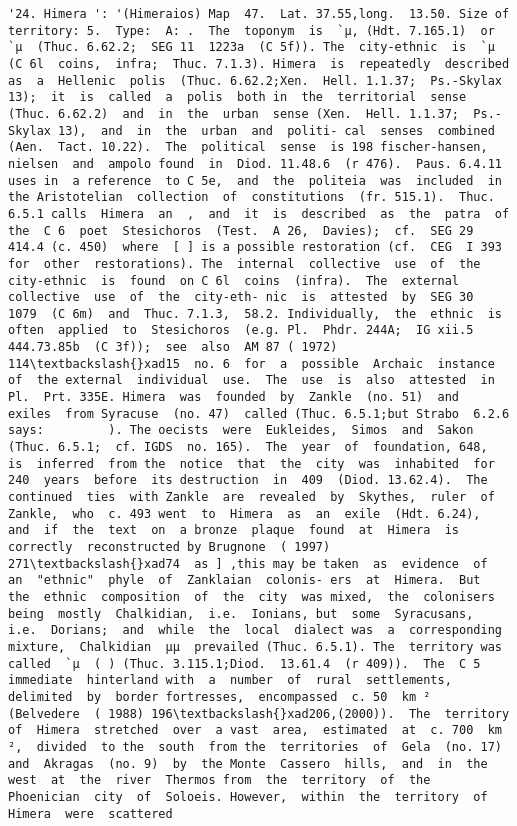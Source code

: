 \documentclass[11pt]{article}
\begin{document}
\begin{Verbatim}[commandchars=\\\{\}]
         '24. Himera ': '(Himeraios) Map  47.  Lat. 37.55,long.  13.50. Size of  territory: 5.  Type:  A: .  The  toponym  is  `µ, (Hdt. 7.165.1)  or  `µ  (Thuc. 6.62.2;  SEG 11  1223a  (C 5f)). The  city-ethnic  is  `µ  (C 6l  coins,  infra;  Thuc. 7.1.3). Himera  is  repeatedly  described  as  a  Hellenic  polis  (Thuc. 6.62.2;Xen.  Hell. 1.1.37;  Ps.-Skylax 13);  it  is  called  a  polis  both in  the  territorial  sense  (Thuc. 6.62.2)  and  in  the  urban  sense (Xen.  Hell. 1.1.37;  Ps.-Skylax 13),  and  in  the  urban  and  politi- cal  senses  combined  (Aen.  Tact. 10.22).  The  political  sense  is 198 fischer-hansen,  nielsen  and  ampolo found  in  Diod. 11.48.6  (r 476).  Paus. 6.4.11  uses in  a reference  to C 5e,  and  the  politeia  was  included  in  the Aristotelian  collection  of  constitutions  (fr. 515.1).  Thuc. 6.5.1 calls  Himera  an  ,  and  it  is  described  as  the  patra  of the  C 6  poet  Stesichoros  (Test.  A 26,  Davies);  cf.  SEG 29  414.4 (c. 450)  where  [ ] is a possible restoration (cf.  CEG  I 393  for  other  restorations). The  internal  collective  use  of  the  city-ethnic  is  found  on C 6l  coins  (infra).  The  external  collective  use  of  the  city-eth- nic  is  attested  by  SEG 30  1079  (C 6m)  and  Thuc. 7.1.3,  58.2. Individually,  the  ethnic  is  often  applied  to  Stesichoros  (e.g. Pl.  Phdr. 244A;  IG xii.5  444.73.85b  (C 3f));  see  also  AM 87 ( 1972)  114\textbackslash{}xad15  no. 6  for  a  possible  Archaic  instance  of  the external  individual  use.  The  use  is  also  attested  in  Pl.  Prt. 335E. Himera  was  founded  by  Zankle  (no. 51)  and  exiles  from Syracuse  (no. 47)  called (Thuc. 6.5.1;but Strabo  6.2.6  says:         ). The oecists  were  Eukleides,  Simos  and  Sakon  (Thuc. 6.5.1;  cf. IGDS  no. 165).  The  year  of  foundation, 648,  is  inferred  from the  notice  that  the  city  was  inhabited  for  240  years  before  its destruction  in  409  (Diod. 13.62.4).  The  continued  ties  with Zankle  are  revealed  by  Skythes,  ruler  of  Zankle,  who  c. 493 went  to  Himera  as  an  exile  (Hdt. 6.24),  and  if  the  text  on  a bronze  plaque  found  at  Himera  is  correctly  reconstructed by Brugnone  ( 1997)  271\textbackslash{}xad74  as ] ,this may be taken  as  evidence  of  an  "ethnic"  phyle  of  Zanklaian  colonis- ers  at  Himera.  But  the  ethnic  composition  of  the  city  was mixed,  the  colonisers  being  mostly  Chalkidian,  i.e.  Ionians, but  some  Syracusans,  i.e.  Dorians;  and  while  the  local  dialect was  a  corresponding  mixture,  Chalkidian  µµ  prevailed (Thuc. 6.5.1). The  territory was  called  `µ  ( ) (Thuc. 3.115.1;Diod.  13.61.4  (r 409)).  The  C 5  immediate  hinterland with  a  number  of  rural  settlements,  delimited  by  border fortresses,  encompassed  c. 50  km ²  (Belvedere  ( 1988) 196\textbackslash{}xad206,(2000)).  The  territory  of  Himera  stretched  over  a vast  area,  estimated  at  c. 700  km ²,  divided  to the  south  from the  territories  of  Gela  (no. 17)  and  Akragas  (no. 9)  by  the Monte  Cassero  hills,  and  in  the  west  at  the  river  Thermos from  the  territory  of  the  Phoenician  city  of  Soloeis. However,  within  the  territory  of  Himera  were  scattered 
\end{Verbatim}
\end{document}
